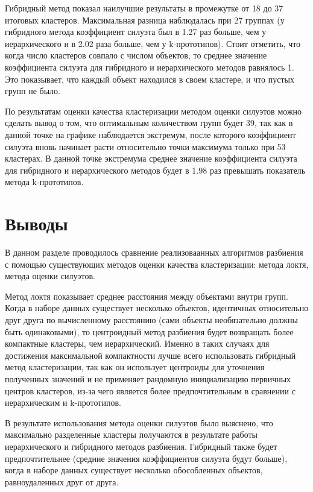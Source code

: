 Гибридный метод показал наилучшие результаты в промежутке от 18 до 37 итоговых кластеров. Максимальная разница наблюдалась при 27 группах (у гибридного метода коэффициент силуэта был в 1.27 раз больше, чем у иерархического и в 2.02 раза больше, чем у k-прототипов). Стоит отметить, что когда число кластеров совпало с числом объектов, то среднее значение коэффициента силуэта для гибридного и иерархического методов равнялось 1. Это показывает, что каждый объект находился в своем кластере, и что пустых групп не было. 

По результатам оценки качества кластеризации методом оценки силуэтов можно сделать вывод о том, что оптимальным количеством групп будет 39, так как в данной точке на графике наблюдается экстремум, после которого коэффициент силуэта вновь начинает расти относительно точки максимума только при 53 кластерах.
В данной точке экстремума среднее значение коэффициента силуэта для гибридного и иерархического методов будет в 1.98 раз превышать показатель метода k-прототипов.

\section*{Выводы}

В данном разделе проводилось сравнение реализоваанных алгоритмов разбиения с помощью существующих методов оценки качества кластеризации: метода локтя, метода оценки силуэтов.

Метод локтя показывает среднее расстояния между объектами внутри групп. 
Когда в наборе данных существует несколько объектов, идентичных относительно друг друга по вычисленному расстоянию (сами объекты необязательно должны быть одинаковыми), то центроидный метод разбиения будет возвращать более компактные кластеры, чем иерархический. 
Именно в таких случаях для достижения максимальной компактности лучше всего использовать гибридный метод кластеризации, так как он использует центроиды для уточнения полученных значений и не применяет рандомную инициализацию первичных центров кластеров, из-за чего является более предпочтительным в сравнении с иерархическим и k-прототипов.

В результате использования метода оценки силуэтов было выяснено, что максимально разделенные кластеры получаются в результате работы иерархического и гибридного методов разбиения. Гибридный также будет предпочтительнее (средние значения коэффициентов силуэта будут больше), когда в наборе данных существует несколько обособленных объектов, равноудаленных друг от друга.
